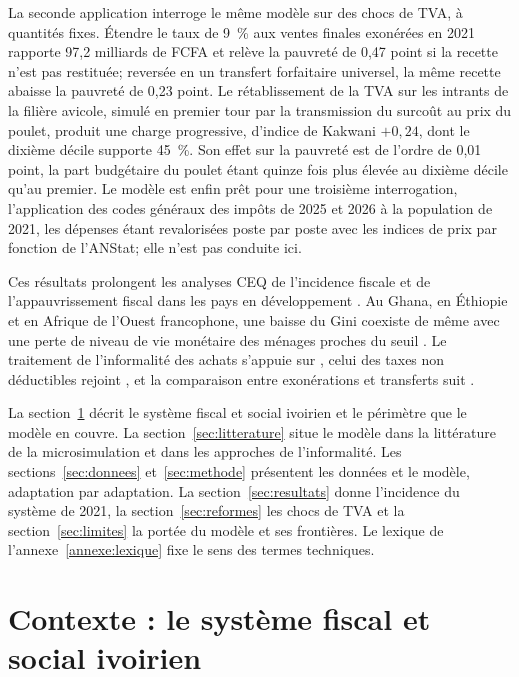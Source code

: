 \documentclass[11pt,a4paper]{article}
\begin{document}
La seconde application interroge le même modèle sur des chocs de TVA, à quantités fixes. Étendre le taux de 9~\% aux ventes finales exonérées en 2021 rapporte 97,2 milliards de FCFA et relève la pauvreté de 0,47 point si la recette n'est pas restituée; reversée en un transfert forfaitaire universel, la même recette abaisse la pauvreté de 0,23 point. Le rétablissement de la TVA sur les intrants de la filière avicole, simulé en premier tour par la transmission du surcoût au prix du poulet, produit une charge progressive, d'indice de Kakwani $+0,24$, dont le dixième décile supporte 45~\%. Son effet sur la pauvreté est de l'ordre de 0,01 point, la part budgétaire du poulet étant quinze fois plus élevée au dixième décile qu'au premier. Le modèle est enfin prêt pour une troisième interrogation, l'application des codes généraux des impôts de 2025 et 2026 à la population de 2021, les dépenses étant revalorisées poste par poste avec les indices de prix par fonction de l'ANStat; elle n'est pas conduite ici.

Ces résultats prolongent les analyses CEQ de l'incidence fiscale et de l'appauvrissement fiscal dans les pays en développement \citep{higgins2016,lustig2017,lustig2022}. Au Ghana, en Éthiopie et en Afrique de l'Ouest francophone, une baisse du Gini coexiste de même avec une perte de niveau de vie monétaire des ménages proches du seuil \citep{younger2015,hill2017,akim2020}. Le traitement de l'informalité des achats s'appuie sur \citet{bachas2024}, celui des taxes non déductibles rejoint \citet{chandler2025}, et la comparaison entre exonérations et transferts suit \citet{warwick2022}.

La section~\ref{sec:contexte} décrit le système fiscal et social ivoirien et le périmètre que le modèle en couvre. La section~\ref{sec:litterature} situe le modèle dans la littérature de la microsimulation et dans les approches de l'informalité. Les sections~\ref{sec:donnees} et~\ref{sec:methode} présentent les données et le modèle, adaptation par adaptation. La section~\ref{sec:resultats} donne l'incidence du système de 2021, la section~\ref{sec:reformes} les chocs de TVA et la section~\ref{sec:limites} la portée du modèle et ses frontières. Le lexique de l'annexe~\ref{annexe:lexique} fixe le sens des termes techniques.

\section{Contexte : le système fiscal et social ivoirien}
\label{sec:contexte}
\end{document}
